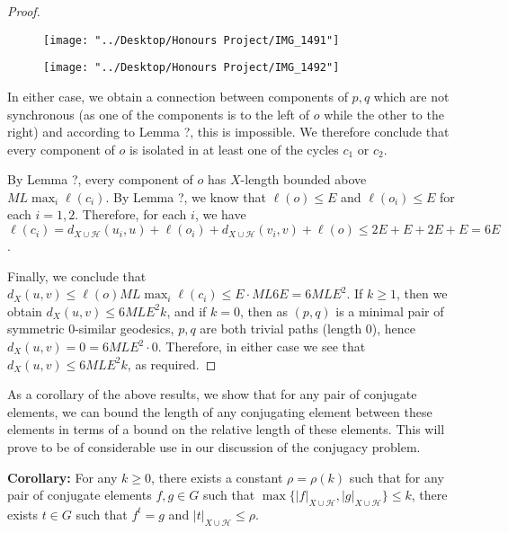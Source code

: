 \documentclass[12pt]{article}
\newcommand{\vs}{\vskip10pt}
\begin{document}
\begin{proof}
		
\begin{figure}
	\centering
	\texttt{[image: "../Desktop/Honours Project/IMG\_1491"]}
	\caption{}
	\label{fig:img1491}
\end{figure}

\begin{figure}
	\centering
	\texttt{[image: "../Desktop/Honours Project/IMG\_1492"]}
	\caption{}
	\label{fig:img1492}
\end{figure}

		In either case, we obtain a connection between components of $p,q$ which are not synchronous (as one of the components is to the left of $o$ while the other to the right) and according to Lemma ?, this is impossible. We therefore conclude that every component of $o$ is isolated in at least one of the cycles $c_1$ or $c_2$. 
		
		\vs 
		
		By Lemma ?, every component of $o$ has $X$-length bounded above $ML \max_i \ell(c_i)$. By Lemma ?, we know that $\ell(o) \leq E$ and $\ell(o_i) \leq E$ for each $i=1,2$. Therefore, for each $i$, we have $\ell(c_i) = d_{X \cup \mathcal{H}}(u_i, u) + \ell(o_i) + d_{X \cup \mathcal{H}} (v_i, v) + \ell(o) \leq 2E + E + 2E + E = 6E$. 
		
		\vs 
		
		Finally, we conclude that $d_X(u,v) \leq \ell(o) ML \max_i \ell(c_i) \leq E \cdot ML6E = 6MLE^2$. If $k \geq 1$, then we obtain $d_X(u,v) \leq 6 ML E^2 k$, and if $k = 0$, then as $(p,q)$ is a minimal pair of symmetric 0-similar geodesics, $p,q$ are both trivial paths (length 0), hence $d_X(u,v) = 0 = 6ML E^2 \cdot 0$. Therefore, in either case we see that $d_X (u,v) \leq 6 ML E^2 k$, as required. 
		
	\end{proof}

	As a corollary of the above results, we show that for any pair of conjugate elements, we can bound the length of any conjugating element between these elements in terms of a bound on the relative length of these elements. This will prove to be of considerable use in our discussion of the conjugacy problem. 
	
	\vs 
	
	\textbf{Corollary: } For any $k \geq 0$, there exists a constant $\rho = \rho(k)$ such that for any pair of conjugate elements $f,g \in G$ such that $\max \{\vert f \vert_{X \cup \mathcal{H}}, \vert g \vert_{X \cup \mathcal{H}}\} \leq k$, there exists $t \in G$ such that $f^t = g$ and $\vert t \vert_{X \cup \mathcal{H}} \leq \rho$. 
	
\end{document}

